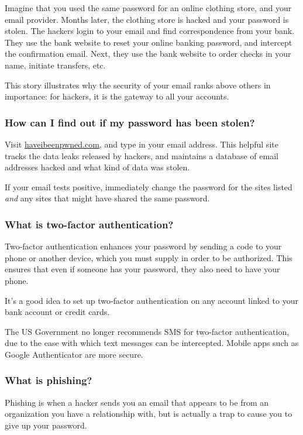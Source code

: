 Imagine that you used the same password for an online clothing store, and your email provider. Months later, the clothing store is hacked and your password is stolen. The hackers login to your email and find correspondence from your bank. They use the bank website to reset your online banking password, and intercept the confirmation email. Next, they use the bank website to order checks in your name, initiate transfers, etc.

This story illustrates why the security of your email ranks above others in importance: for hackers, it is the gateway to all your accounts.

\subsubsection{How can I find out if my password has been stolen?}

Visit \url{haveibeenpwned.com}, and type in your email address. This helpful site tracks the data leaks released by hackers, and maintains a database of email addresses hacked and what kind of data was stolen.

If your email tests positive, immediately change the password for the sites listed \textit{and} any sites that might have shared the same password. 

\subsubsection{What is two-factor authentication?}

Two-factor authentication enhances your password by sending a code to your phone or another device, which you must supply in order to be authorized. This ensures that even if someone has your password, they also need to have your phone.

It's a good idea to set up two-factor authentication on any account linked to your bank account or credit cards.

The US Government no longer recommends SMS for two-factor authentication, due to the ease with which text messages can be intercepted. Mobile apps such as Google Authenticator are more secure.

\subsubsection{What is phishing?}

Phishing is when a hacker sends you an email that appears to be from an organization you have a relationship with, but is actually a trap to cause you to give up your password.

